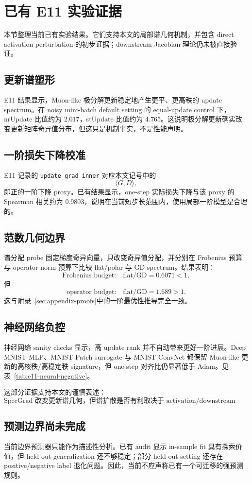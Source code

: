 \section{已有 E11 实验证据}
\label{sec:e11}

本节整理当前已有实验结果。它们支持本文的局部谱几何机制，并包含 direct activation perturbation 的初步证据；downstream Jacobian 理论仍未被直接验证。

\subsection{更新谱塑形}

E11 结果显示，Muon-like 极分解更新稳定地产生更平、更高秩的 update spectrum。在 noisy mini-batch default setting 的 equal-update control 下，nrUpdate 比值约为 \(2.017\)，stUpdate 比值约为 \(4.765\)。这说明极分解更新确实改变更新矩阵奇异值分布，但这只是机制事实，不是性能声明。



\subsection{一阶损失下降校准}

E11 记录的 \texttt{update\_grad\_inner} 对应本文记号中的
\[
\langle G,D\rangle,
\]
即正的一阶下降 proxy。已有结果显示，one-step 实际损失下降与该 proxy 的 Spearman 相关约为 \(0.9803\)，说明在当前短步长范围内，使用局部一阶模型是合理的。

\subsection{范数几何边界}

谱分配 probe 固定梯度奇异向量，只改变奇异值分配，并分别在 Frobenius 预算与 operator-norm 预算下比较 flat/polar 与 GD-spectrum。结果表明：
\[
\text{Frobenius budget:}\quad \text{flat/GD}=0.6071<1,
\]
但
\[
\text{operator budget:}\quad \text{flat/GD}=1.689>1.
\]
这与附录~\ref{sec:appendix-proofs}中的一阶最优性推导完全一致。

\subsection{神经网络负控}

神经网络 sanity checks 显示，高 update rank 并不自动带来更好一阶进展。Deep MNIST MLP、MNIST Patch surrogate 与 MNIST ConvNet 都保留 Muon-like 更新的高核秩/高稳定秩 signature，但 one-step 对齐比仍显著低于 Adam。见表~\ref{tab:e11-neural-negative}。



这部分证据支持本文的谨慎表述：
\[
\boxed{\text{SpecGrad 改变更新谱几何，但谱扩散是否有利取决于 activation/downstream geometry。}}
\]

\subsection{预测边界尚未完成}

当前边界预测器只能作为描述性分析。已有 audit 显示 in-sample fit 具有探索价值，但 held-out generalization 还不够稳定；部分 held-out setting 还存在 positive/negative label 退化问题。因此，当前不应声称已有一个可迁移的强预测规则。
